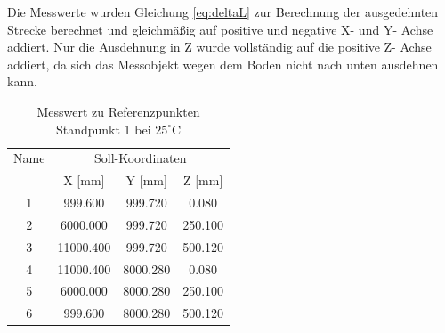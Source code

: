 Die Messwerte wurden Gleichung \ref{eq:deltaL} zur Berechnung der ausgedehnten Strecke berechnet und gleichmäßig auf positive und negative X- und Y- Achse addiert. Nur die Ausdehnung in Z wurde vollständig auf die positive Z- Achse addiert, da sich das Messobjekt wegen dem Boden nicht nach unten ausdehnen kann.
\begin{table}[h]\label{tab:ausdehnung1}
\centering
\caption{Messwert zu Referenzpunkten Standpunkt 1 bei $25^\circ\text{C}$}

\begin{tabular}{cccc}
\toprule
\multicolumn{1}{c|}{Name} &
\multicolumn{3}{c}{Soll-Koordinaten} \\
\multicolumn{1}{c|}{} &
\multicolumn{1}{c|}{X [mm]} &
\multicolumn{1}{c|}{Y [mm]} &
\multicolumn{1}{c}{Z [mm]} \\
\midrule

\multicolumn{1}{c|}{1} &
\multicolumn{1}{c|}{999.600} &
\multicolumn{1}{c|}{999.720} &
\multicolumn{1}{c}{0.080} \\

\multicolumn{1}{c|}{2} &
\multicolumn{1}{c|}{6000.000} &
\multicolumn{1}{c|}{999.720} &
\multicolumn{1}{c}{250.100} \\

\multicolumn{1}{c|}{3} &
\multicolumn{1}{c|}{11000.400} &
\multicolumn{1}{c|}{999.720} &
\multicolumn{1}{c}{500.120} \\

\multicolumn{1}{c|}{4} &
\multicolumn{1}{c|}{11000.400} &
\multicolumn{1}{c|}{8000.280} &
\multicolumn{1}{c}{0.080} \\

\multicolumn{1}{c|}{5} &
\multicolumn{1}{c|}{6000.000} &
\multicolumn{1}{c|}{8000.280} &
\multicolumn{1}{c}{250.100} \\

\multicolumn{1}{c|}{6} &
\multicolumn{1}{c|}{999.600} &
\multicolumn{1}{c|}{8000.280} &
\multicolumn{1}{c}{500.120} \\
\bottomrule
\end{tabular}
\end{table}

